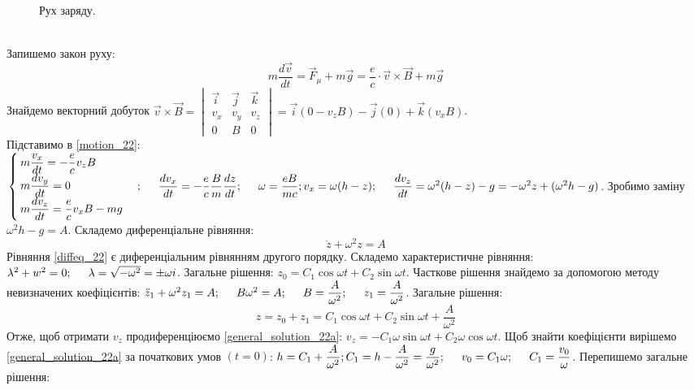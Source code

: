 \documentclass[a4paper,12pt]{article}
\newcommand\tab [1][0.5cm]{\hspace*{#1}}
\begin{document}
\begin{justify}
\begin{itemize}
\begin{figure}[htp]
			\caption{Рух заряду.}
			\label{plot_22}
			\end{figure}\\
			Запишемо закон руху:
			\begin{equation}
				m\dfrac{d\vec{v}}{dt}=\vec{F}_\mu+m\vec{g}=\dfrac{e}{c}\cdot\vec{v}\times\vec{B}+m\vec{g}
				\label{motion_22}
			\end{equation} 
			Знайдемо векторний добуток $\vec{v}\times\vec{B}=
			\begin{vmatrix}
				\vec{i}&\vec{j}&\vec{k}\\
				v_x&v_y&v_z\\
				0&B&0
			\end{vmatrix}=\vec{i}(0-v_zB)-\vec{j}(0)+\vec{k}(v_xB)$.\\
			Підставимо в \ref{motion_22}:
			$\begin{cases}
				m\dfrac{v_x}{dt}=-\dfrac{e}{c}v_zB\\
				m\dfrac{dv_y}{dt}=0\\
				m\dfrac{dv_z}{dt}=\dfrac{e}{c}v_xB-mg
			\end{cases};\tab 
			\dfrac{dv_x}{dt}=-\dfrac{e}{c}\dfrac{B}{m}\dfrac{dz}{dt};\tab \omega=\dfrac{eB}{mc};\\ v_x=\omega(h-z);\tab \dfrac{dv_z}{dt}=\omega^2(h-z)-g=-\omega^2z+(\omega^2h-g)$. Зробимо заміну $\omega^2h-g=A$. Складемо диференціальне рівняння:  
			\begin{equation}
				\ddot{z}+\omega^2z=A
				\label{diffeq_22}
			\end{equation}
			Рівняння \ref{diffeq_22} є диференціальним рівнянням другого порядку. Складемо характеристичне рівняння: $\lambda^2+w^2=0;\tab \lambda=\sqrt{-\omega^2}=\pm\omega i$. Загальне рішення: $z_0=C_1\cos\omega t+C_2\sin\omega t$. Часткове рішення знайдемо за допомогою методу невизначених коефіцієнтів: $\ddot{z}_1+\omega^2z_1=A;\tab B\omega^2=A;\tab B=\dfrac{A}{\omega^2};\tab z_1=\dfrac{A}{\omega^2}$. Загальне рішення:
			\begin{equation}
				z=z_0+z_1=C_1\cos\omega t+C_2\sin\omega t+\dfrac{A}{\omega^2}
				\label{general_solution_22a}
			\end{equation} 
			Отже, щоб отримати $v_z$ продиференціюємо \ref{general_solution_22a}: $v_z=-C_1\omega\sin\omega t+C_2\omega\cos\omega t$. Щоб знайти коефіцієнти вирішемо \ref{general_solution_22a} за початкових умов $(t=0)$: $h=C_1+\dfrac{A}{\omega^2};\\ C_1=h-\dfrac{A}{\omega^2}=\dfrac{g}{\omega^2};\tab v_0=C_1\omega;\tab C_1=\dfrac{v_0}{\omega}$. Перепишемо загальне рішення:

\end{itemize}
\end{justify}
\end{document}
